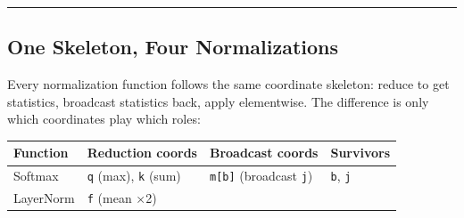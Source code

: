 \documentclass[11pt,]{article}
\begin{document}
\begin{center}\rule{0.5\linewidth}{0.4pt}\end{center}

\hypertarget{one-skeleton-four-normalizations}{%
\subsection{One Skeleton, Four
Normalizations}\label{one-skeleton-four-normalizations}}

Every normalization function follows the same coordinate skeleton:
reduce to get statistics, broadcast statistics back, apply elementwise.
The difference is only which coordinates play which roles:

\begin{longtable}[]{@{}llll@{}}
\toprule
\begin{minipage}[b]{0.22\columnwidth}\raggedright
Function\strut
\end{minipage} & \begin{minipage}[b]{0.22\columnwidth}\raggedright
Reduction coords\strut
\end{minipage} & \begin{minipage}[b]{0.22\columnwidth}\raggedright
Broadcast coords\strut
\end{minipage} & \begin{minipage}[b]{0.22\columnwidth}\raggedright
Survivors\strut
\end{minipage}\tabularnewline
\midrule
\endhead
\begin{minipage}[t]{0.22\columnwidth}\raggedright
Softmax\strut
\end{minipage} & \begin{minipage}[t]{0.22\columnwidth}\raggedright
\texttt{q} (max), \texttt{k} (sum)\strut
\end{minipage} & \begin{minipage}[t]{0.22\columnwidth}\raggedright
\texttt{m{[}b{]}} (broadcast \texttt{j})\strut
\end{minipage} & \begin{minipage}[t]{0.22\columnwidth}\raggedright
\texttt{b}, \texttt{j}\strut
\end{minipage}\tabularnewline
\begin{minipage}[t]{0.22\columnwidth}\raggedright
LayerNorm\strut
\end{minipage} & \begin{minipage}[t]{0.22\columnwidth}\raggedright
\texttt{f} (mean ×2)\strut
\end{minipage} & \begin{minipage}[t]{0.22\columnwidth}\raggedright

\end{minipage}
\end{longtable}
\end{document}
